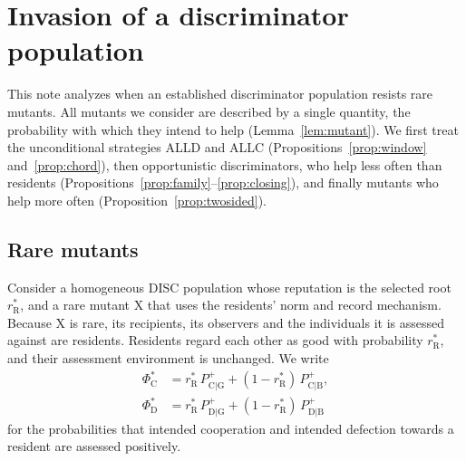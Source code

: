 \documentclass[10pt]{wlscirep}
\newcommand{\Pp}[1]{P^{+}_{\mathrm{#1}}}   %
\newcommand{\rR}{r_{\mathrm{R}}^{*}}
\newcommand{\PhiCs}{\Phi^{*}_{\mathrm{C}}}
\newcommand{\PhiDs}{\Phi^{*}_{\mathrm{D}}}
\theoremstyle{plain}
\theoremstyle{remark}
\begin{document}
\FloatBarrier
\section{Invasion of a discriminator population}
\label{si:invasion}

This note analyzes when an established discriminator population resists rare mutants. All mutants we consider are described by a single quantity, the probability with which they intend to help (Lemma~\ref{lem:mutant}). We first treat the unconditional strategies ALLD and ALLC (Propositions~\ref{prop:window} and~\ref{prop:chord}), then opportunistic discriminators, who help less often than residents (Propositions~\ref{prop:family}--\ref{prop:closing}), and finally mutants who help more often (Proposition~\ref{prop:twosided}).

\subsection{Rare mutants}
\label{si:mutant}

Consider a homogeneous DISC population whose reputation is the selected root $\rR$, and a rare mutant X that uses the residents' norm and record mechanism. Because X is rare, its recipients, its observers and the individuals it is assessed against are residents. Residents regard each other as good with probability $\rR$, and their assessment environment is unchanged. We write
\begin{equation}
\begin{aligned}
\PhiCs&=\rR\,\Pp{C|G}+(1-\rR)\,\Pp{C|B},\\
\PhiDs&=\rR\,\Pp{D|G}+(1-\rR)\,\Pp{D|B}
\end{aligned}
\label{eq:s-phistar}
\end{equation}
for the probabilities that intended cooperation and intended defection towards a resident are assessed positively.
\end{document}
